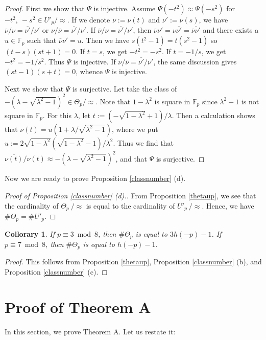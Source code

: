 \documentclass[10pt,a4paper]{amsart}
\theoremstyle{plain}
\newtheorem{cor}[defn]{Collorary}
\newcommand{\lm}{\lambda}
\newcommand{\fp}{\mathbb{F}_p}
\begin{document}
\begin{proof}
 First we show that $\Psi$ is injective. Assume $\Psi(-t^2) \approx \Psi(-s^2)$ for $-t^2,\ -s^2 \in U'_p/\approx$. If we denote $\nu:=\nu(t)$ and $ {\nu}':=\nu(s)$, we have $\overline{\nu}/\nu=\overline{{\nu}'}/{\nu}' \text{ or } \nu/\overline{\nu}=\overline{{\nu}'}/{\nu}'$. If $\overline{\nu}/\nu=\overline{{\nu}'}/{\nu}'$, then $\overline{\nu}{\nu}'=\nu \overline{{\nu}'}=\overline{\overline{\nu}{\nu}'}$ and there exists a $u\in \fp$ such that $\overline{\nu}{\nu}'=u$. Then we have $s(t^2-1)=t(s^2-1)$ \textcolor{black}{so} $(t-s)(st+1)=0$. If $t=s$, we get $-t^2=-s^2$. If $t=-1/s$, we get $-t^2=-1/s^2$. Thus $\Psi$ is injective. If $\nu/\overline{\nu}=\overline{{\nu}'}/{\nu}'$, the same discussion gives $(st-1)(s+t)=0$, whence $\Psi$ is injective.
 
Next we show that $\Psi$ is surjective. Let take the class of $-(\lm-\sqrt{{\lm}^2-1})^2 \in {\Theta}_p/\approx$.
    Note that $1-{\lm}^2$ is square in $\fp$ since ${\lm}^2-1$ is not square in $\fp$. For this $\lm$, let $t:=(-\sqrt{1-{\lm}^2}+1)/\lm$. Then a calculation shows that $\nu(t)=u( 1+\lm/\sqrt{{\lm}^2-1} )$, where we put $u:=2\sqrt{1-{\lm}^2}(\sqrt{1-{\lm}^2}-1)/{\lm}^2$. Thus we find that $\overline{\nu(t)}/\nu(t) \approx -\left( \lm -\sqrt{{\lm}^2-1} \right)^2$, and that $\Psi$ is surjective.
\end{proof}

  Now we are ready to prove Proposition \ref{classnumber} (d).
\begin{proof}[Proof of Proposition \ref{classnumber} \rm{(d)}.]
    From Proposition \ref{thetaup}, we see that the cardinality of ${\Theta}_p \ /\approx$ is equal to the cardinality of $U'_p \ /\approx$. Hence, we have $\# {\Theta}_p=\# U'_p$.
\end{proof}


\begin{cor}
\label{corsp837}
If $p \equiv 3 \bmod 8$, then $\# {\Theta}_p$ is equal to $3h(-p)-1$. If $p \equiv 7  \bmod 8$, then $\# {\Theta}_p$ is equal to $h(-p)-1$.
\end{cor}
\begin{proof}
    This follows from Proposition \ref{thetaup}, Proposition \ref{classnumber} (b), and Proposition \ref{classnumber} (c).
\end{proof}

\section{Proof of Theorem A}
In this section, we prove Theorem A. Let us restate it:
\end{document}
